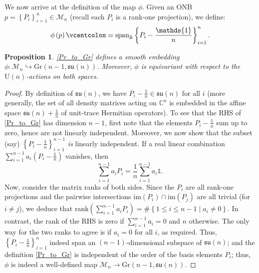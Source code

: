 \documentclass[referee,sn-mathphys-num]{sn-jnl}%
\theoremstyle{thmstyleone}%
\newtheorem{proposition}[theorem]{Proposition}%
\theoremstyle{thmstyletwo}%
\theoremstyle{remark}
\theoremstyle{thmstylethree}%
\newcommand{\defeq}{\vcentcolon=}
\begin{document}
We now arrive at the definition of the map $\phi$.
Given an ONB $p = \left\{ P_i \right\}_{i=1}^n \in \mathcal{M}_n $ (recall each $P_i$ is a rank-one projection), we define:
\begin{equation}\label{Pr_to_Gr}
	\phi \left( p \right) \defeq \mathrm{span}_{\mathbb{R}} \left\{ P_i -\frac{\mathds{1}}{n} \right\}_{i=1}^n .
\end{equation}
\begin{proposition}\label{prop:phi}
	\eqref{Pr_to_Gr} defines a smooth embedding $ \phi : \mathcal{M}_n \hookrightarrow \mathrm{Gr} \left(  n-1, \mathfrak{su} \left( n \right) \right) $. Moreover, $\phi$ is equivariant with respect to the $ \mathrm{U} \left( n \right) $-actions on both spaces.
\end{proposition}
\begin{proof}
	By definition of $ \mathfrak{su} \left( n \right) $, we have $ P_i -\frac{\mathds{1}}{n} \in \mathfrak{su} \left( n \right) $ for all $i$ (more generally, the set of all density matrices acting on $ \mathbb{C}^n $ is embedded in the affine space $ \mathfrak{su} \left( n \right) + \frac{\mathds{1}}{n} $ of unit-trace Hermitian operators). To see that the RHS of \eqref{Pr_to_Gr} has dimension $n-1$, first note that the elements $ P_i -\frac{\mathds{1}}{n} $ sum up to zero, hence are not linearly independent. Moreover, we now show that the subset (say) $ \left\{ P_i -\frac{\mathds{1}}{n} \right\}_{i=1}^{n-1} $ \emph{is} linearly independent. If a real linear combination $ \sum_{i=1}^{n-1} a_i \left( P_i -\frac{\mathds{1}}{n} \right) $ vanishes, then
	\begin{equation*}
		\sum_{i=1}^{n-1} a_i P_i = \frac{1}{n} \sum_{i=1}^{n-1} a_i \mathds{1} .
	\end{equation*}
	Now, consider the matrix ranks of both sides. Since the $P_i$ are all rank-one projections and the pairwise intersections $ \mathrm{im} \left( P_i \right) \cap \mathrm{im} \left( P_j \right) $ are all trivial (for $i \neq j$), we deduce that $ \mathrm{rank} \left( \sum_{i=1}^{n-1} a_i P_i \right) = \# \left\{ 1 \leq i \leq n-1 \mid a_i \neq 0 \right\} $. In contrast, the rank of the RHS is zero if $ \sum_{i=1}^{n-1} a_i = 0 $ and $n$ otherwise. The only way for the two ranks to agree is if $a_i=0$ for all $i$, as required. Thus, $ \left\{ P_i -\frac{\mathds{1}}{n} \right\}_{i=1}^n $ indeed span an $\left( n-1 \right)$-dimensional subspace of $ \mathfrak{su} \left( n \right) $; and the definition \eqref{Pr_to_Gr} is independent of the order of the basis elements $P_i$; thus, $\phi$ is indeed a well-defined map $ \mathcal{M}_n \rightarrow \mathrm{Gr} \left(  n-1, \mathfrak{su} \left( n \right) \right) $.
	

\end{proof}
\end{document}
